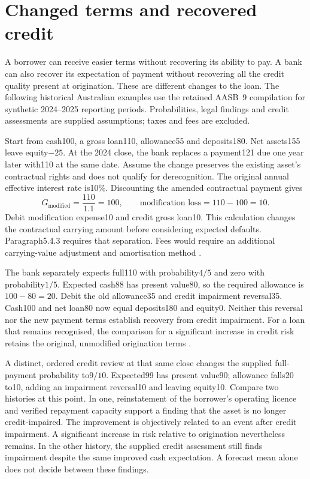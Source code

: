 \section{Changed terms and recovered credit}\label{sec:bank-restructuring}

A borrower can receive easier terms without recovering its ability to pay.
A bank can also recover its expectation of payment without recovering all
the credit quality present at origination. These are different changes to
the loan. The following historical Australian examples use the retained
AASB~9 compilation for synthetic 2024--2025 reporting periods. Probabilities,
legal findings and credit assessments are supplied assumptions; taxes and
fees are excluded.

Start from cash100, a gross loan110, allowance55 and deposits180. Net assets155
leave equity$-25$. At the 2024 close, the bank replaces a payment121 due
one year later with110 at the same date. Assume the change preserves the
existing asset's contractual rights and does not qualify for derecognition.
The original annual effective interest rate is10\%. Discounting the amended
contractual payment gives
\[
 G_{\mathrm{modified}}=\frac{110}{1.1}=100,
 \qquad \text{modification loss}=110-100=10.
\]
Debit modification expense10 and credit gross loan10. This calculation changes
the contractual carrying amount before considering expected defaults.
Paragraph5.4.3 requires that separation. Fees would require an additional
carrying-value adjustment and amortisation method
\citep[paragraph5.4.3]{aasb9dated}.

The bank separately expects full110 with probability$4/5$ and zero with
probability$1/5$. Expected cash88 has present value80, so the required
allowance is$100-80=20$. Debit the old allowance35 and credit impairment
reversal35. Cash100 and net loan80 now equal deposits180 and equity0.
Neither this reversal nor the new payment terms establish recovery from
credit impairment. For a loan that remains recognised, the comparison for a
significant increase in credit risk retains the original, unmodified
origination terms \citep[paragraph5.5.12 and B5.5.27]{aasb9dated}.

A distinct, ordered credit review at that same close changes the supplied
full-payment probability to$9/10$. Expected99 has present value90; allowance
falls20 to10, adding an impairment reversal10 and leaving equity10.
Compare two histories at this point. In one, reinstatement of the borrower's
operating licence and verified repayment capacity support a finding that the
asset is no longer credit-impaired. The improvement is objectively related to
an event after credit impairment. A significant increase in risk relative to
origination nevertheless remains. In the other history, the supplied credit
assessment still finds impairment despite the same improved cash expectation.
A forecast mean alone does not decide between these findings.

